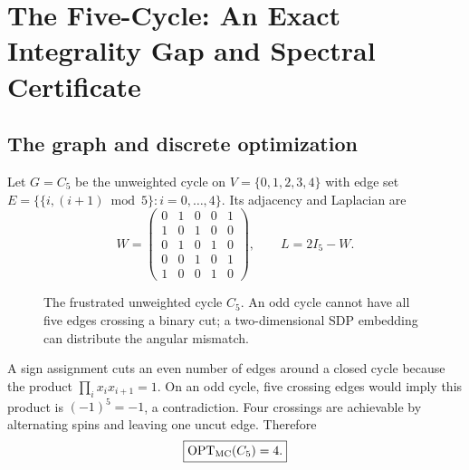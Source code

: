 \chapter{The Five-Cycle: An Exact Integrality Gap and Spectral Certificate}\label{ch:cycle5}
\section{The graph and discrete optimization}
Let $G=C_5$ be the unweighted cycle on $V=\{0,1,2,3,4\}$ with edge set $E=\{\{i,(i+1)\bmod 5\}:i=0,\ldots,4\}$. Its adjacency and Laplacian are
\begin{equation}
W=\begin{pmatrix}0&1&0&0&1\\1&0&1&0&0\\0&1&0&1&0\\0&0&1&0&1\\1&0&0&1&0\end{pmatrix},\qquad L=2I_5-W.
\end{equation}
\begin{figure}[ht]
\centering
{}
\caption{The frustrated unweighted cycle $C_5$. An odd cycle cannot have all five edges crossing a binary cut; a two-dimensional SDP embedding can distribute the angular mismatch.}\label{fig:c5}
\end{figure}

A sign assignment cuts an even number of edges around a closed cycle because the product $\prod_i x_ix_{i+1}=1$. On an odd cycle, five crossing edges would imply this product is $(-1)^5=-1$, a contradiction. Four crossings are achievable by alternating spins and leaving one uncut edge. Therefore
\begin{equation}\label{eq:c5cut}\boxed{\operatorname{OPT}_{\mathrm{MC}}(C_5)=4.}\end{equation}

